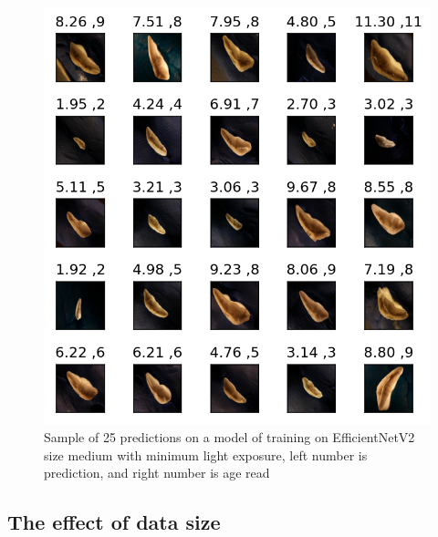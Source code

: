 \documentclass[10pt,letterpaper]{article}
\begin{document}
\begin{figure}[h!]
  \centering
  \begin{minipage}[b]{1.0\textwidth}
  \includegraphics[scale=0.75]{results/fold_prediction_V2_m.png}
    \caption{Sample of 25 predictions on a model of training on EfficientNetV2 size medium with minimum light exposure, left number is prediction,
    and right number is age read}
   \label{marker13}
  \end{minipage}
  \hfill
\end{figure}

\subsection*{The effect of data size}
\end{document}
